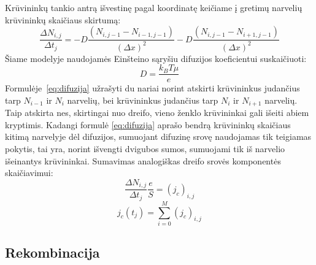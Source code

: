 Krūvininkų tankio antrą išvestinę pagal koordinatę keičiame į gretimų narvelių krūvininkų skaičiaus skirtumą:
\begin{equation} \label{eq:difuzija}
\frac{\Delta N_{i,j}}{\Delta t_j} = -D \frac{(N_{i,j-1}-N_{i-1,j-1})}{(\Delta x)^2} - D \frac{(N_{i,j-1}-N_{i+1,j-1})}{(\Delta x)^2}
\end{equation}
Šiame modelyje naudojamės Einšteino sąryšiu difuzijos koeficientui suskaičiuoti:
\[
	D=\frac{k_B T \mu }{e}
\]	
Formulėje~\eqref{eq:difuzija} užrašyti du nariai norint atskirti krūvininkus judančius tarp \(N_{i-1}\) ir \(N_i\) narvelių, bei krūvininkus judančius tarp \(N_i\) ir \(N_{i+1}\) narvelių. Taip atskirta nes, skirtingai nuo dreifo, vieno ženklo krūvininkai gali išeiti abiem kryptimis.
Kadangi formulė \eqref{eq:difuzija} aprašo bendrą krūvininkų skaičiaus kitimą narvelyje dėl difuzijos, sumuojant difuzinę srovę naudojamas tik teigiamas pokytis, tai yra, norint išvengti dvigubos sumos, sumuojami tik iš narvelio išeinantys krūvininkai. Sumavimas analogiškas dreifo srovės komponentės skaičiavimui:
\begin{equation}
	\frac{\Delta N_{i,j}}{\Delta t_j} \frac{e}{S}=(j_c)_{i,j}
\end{equation}
\begin{equation}
	j_c(t_j)= \sum_{i=0}^{M} (j_c)_{i,j}
\end{equation}
	
\subsection{Rekombinacija}

